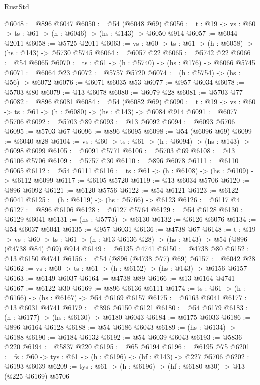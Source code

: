 \begin{lexlean}{RustStd}
\begin{coremodule}
@6048 := @896 @6047
@6050 := @54 (@6048 @69)
@6056 := {t : @19} -> {vs : @60} -> {ts : @61} -> (h : @6046) -> (hs : @143) -> @6050 @914
@6057 := @6044 @2011
@6058 := @5725 @2011
@6063 := {vs : @60} -> {ts : @61} -> (h : @6058) -> (hs : @143) -> @5730 @5745
@6064 := @6057 @22
@6065 := @5742 @22
@6066 := @54 @6065
@6070 := {ts : @61} -> (h : @5740) -> (hs : @176) -> @6066 @5745
@6071 := @6064 @23
@6072 := @5757 @5720
@6074 := (h : @5754) -> (hs : @56) -> @6072
@6076 := @6071 @6035 @53
@6077 := @957 @6034
@6078 := @5703 @80
@6079 := @13 @6078
@6080 := @6079 @28
@6081 := @5703 @77
@6082 := @896 @6081
@6084 := @54 (@6082 @69)
@6090 := {t : @19} -> {vs : @60} -> {ts : @61} -> (h : @6080) -> (hs : @143) -> @6084 @914
@6091 := @6077 @5706
@6092 := @5703 @89
@6093 := @13 @6092
@6094 := @6093 @5706
@6095 := @5703 @67
@6096 := @896 @6095
@6098 := @54 (@6096 @69)
@6099 := @6040 @28
@6104 := {vs : @60} -> {ts : @61} -> (h : @6094) -> (hs : @143) -> @6098 @6099
@6105 := @6091 @5771
@6106 := @5703 @69
@6108 := @13 @6106 @5706
@6109 := @5757 @30
@6110 := @896 @6078
@6111 := @6110 @6065
@6112 := @54 @6111
@6116 := {ts : @61} -> (h : @6108) -> (hs : @6109) -> @6112 @6099
@6117 := @6105 @5720
@6119 := @13 @6034 @5706
@6120 := @896 @6092
@6121 := @6120 @5756
@6122 := @54 @6121
@6123 := @6122 @6041
@6125 := (h : @6119) -> (hs : @5766) -> @6123
@6126 := @6117 @4
@6127 := @896 @6106
@6128 := @6127 @5764
@6129 := @54 @6128
@6130 := @6129 @6041
@6131 := (hs : @5773) -> @6130
@6132 := @6126 @6076
@6134 := @54 @6037 @6041
@6135 := @957 @6031
@6136 := @4738 @67
@6148 := {t : @19} ->
  {vs : @60} -> {ts : @61} -> (h : @13 @6136 @28) -> (hs : @143) -> @54 (@896 (@4738 @84) @69) @914
@6149 := @6135 @4741
@6150 := @4738 @80
@6152 := @13 @6150 @4741
@6156 := @54 (@896 (@4738 @77) @69)
@6157 := @6042 @28
@6162 := {vs : @60} -> {ts : @61} -> (h : @6152) -> (hs : @143) -> @6156 @6157
@6163 := @6149 @6037
@6164 := @4738 @89
@6166 := @13 @6164 @4741
@6167 := @6122 @30
@6169 := @896 @6136 @6111
@6174 := {ts : @61} -> (h : @6166) -> (hs : @6167) -> @54 @6169 @6157
@6175 := @6163 @6041
@6177 := @13 @6031 @4741
@6179 := @896 @6150 @6121
@6180 := @54 @6179
@6183 := (h : @6177) -> (hs : @6130) -> @6180 @6043
@6184 := @6175 @6033
@6186 := @896 @6164 @6128
@6188 := @54 @6186 @6043
@6189 := (hs : @6134) -> @6188
@6190 := @6184 @6132
@6192 := @54 @6039 @6043
@6193 := @5836 @220
@6194 := @5837 @220
@6195 := @65 @6194
@6196 := @6195 @75
@6201 := {fs : @60} -> {tys : @61} -> (h : @6196) -> (hf : @143) -> @227 @5706
@6202 := @6193 @6039
@6209 := {tys : @61} -> (h : @6196) -> (hf : @6180 @30) -> @13 (@225 @6169) @5706

\end{coremodule}
\end{lexlean}
